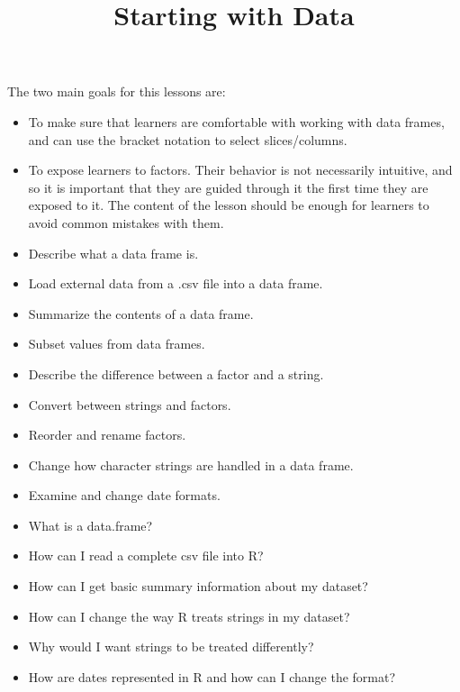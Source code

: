 \documentclass[
]{article}
\title{Starting with Data}
\author{}
\date{\vspace{-2.5em}}
\providecommand{\tightlist}{%
  \setlength{\itemsep}{0pt}\setlength{\parskip}{0pt}}
\begin{document}
\maketitle

The two main goals for this lessons are:

\begin{itemize}
\tightlist
\item
  To make sure that learners are comfortable with working with data
  frames, and can use the bracket notation to select slices/columns.
\item
  To expose learners to factors. Their behavior is not necessarily
  intuitive, and so it is important that they are guided through it the
  first time they are exposed to it. The content of the lesson should be
  enough for learners to avoid common mistakes with them.
\end{itemize}

\begin{itemize}
\tightlist
\item
  Describe what a data frame is.
\item
  Load external data from a .csv file into a data frame.
\item
  Summarize the contents of a data frame.
\item
  Subset values from data frames.
\item
  Describe the difference between a factor and a string.
\item
  Convert between strings and factors.
\item
  Reorder and rename factors.
\item
  Change how character strings are handled in a data frame.
\item
  Examine and change date formats.
\end{itemize}

\begin{itemize}
\tightlist
\item
  What is a data.frame?
\item
  How can I read a complete csv file into R?
\item
  How can I get basic summary information about my dataset?
\item
  How can I change the way R treats strings in my dataset?
\item
  Why would I want strings to be treated differently?
\item
  How are dates represented in R and how can I change the format?
\end{itemize}
\end{document}
